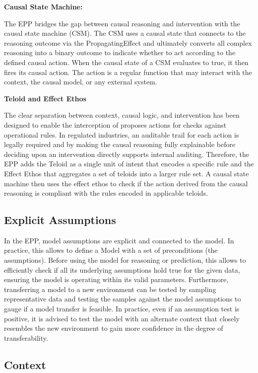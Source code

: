 \textbf{Causal State Machine:}

The EPP bridges the gap between causal reasoning and intervention with the causal state machine (CSM). The CSM uses a causal state that connects to the reasoning outcome via the  PropagatingEffect and ultimately converts all complex reasoning into a binary outcome to indicate whether to act according to the defined causal action. When the causal state of a CSM evaluates to true, it then fires its causal action. The action is a regular function that may interact with the context, the causal model, or any external system.  

\textbf{Teloid and Effect Ethos}

The clear separation between context, causal logic, and intervention has been designed to enable the interception of proposes actions for checks against operational rules. In regulated industries, an auditable trail for each action is legally required  and by making the causal reasoning fully explainable before deciding upon an intervention directly supports internal auditing. Therefore, the EPP adds the Teloid as a single unit of intent that encodes a specific rule and the Effect Ethos that aggregates a set of teloids into a larger rule set. A causal state machine then uses the effect ethos to check if the action derived from the causal reasoning is compliant with the rules encoded in applicable teloids.    

%
%
\subsection{Explicit Assumptions}
\label{sec:assumptions}
 
 In the EPP, model assumptions are explicit and connected to the model.  In practice, this allows to define a Model with a set of preconditions (the
  assumptions). Before using the model for reasoning or prediction, this allows to efficiently check if all its underlying
  assumptions hold true for the given data, ensuring the model is operating within its  valid parameters. Furthermore, transferring a model to a new environment can be
  tested by sampling representative data and testing the samples against the model assumptions to gauge if a model transfer is feasible. In practice, even if an assumption test is positive, it is advised to test the model with an alternate context that closely resembles the new environment to gain more confidence in the degree of transferability. 
 
%
%
\subsection{Context}
\label{sec:epp_context}

